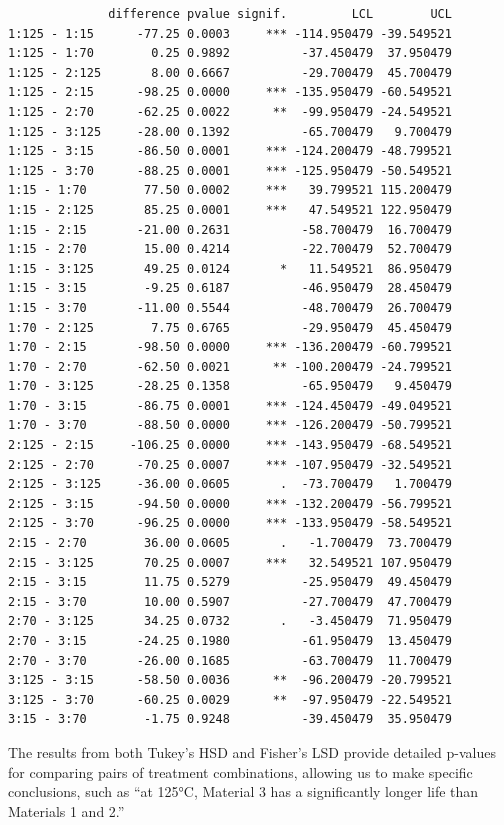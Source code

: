 \documentclass[
  letterpaper,
]{scrbook}
\begin{document}
\begin{verbatim}
              difference pvalue signif.         LCL        UCL
1:125 - 1:15      -77.25 0.0003     *** -114.950479 -39.549521
1:125 - 1:70        0.25 0.9892          -37.450479  37.950479
1:125 - 2:125       8.00 0.6667          -29.700479  45.700479
1:125 - 2:15      -98.25 0.0000     *** -135.950479 -60.549521
1:125 - 2:70      -62.25 0.0022      **  -99.950479 -24.549521
1:125 - 3:125     -28.00 0.1392          -65.700479   9.700479
1:125 - 3:15      -86.50 0.0001     *** -124.200479 -48.799521
1:125 - 3:70      -88.25 0.0001     *** -125.950479 -50.549521
1:15 - 1:70        77.50 0.0002     ***   39.799521 115.200479
1:15 - 2:125       85.25 0.0001     ***   47.549521 122.950479
1:15 - 2:15       -21.00 0.2631          -58.700479  16.700479
1:15 - 2:70        15.00 0.4214          -22.700479  52.700479
1:15 - 3:125       49.25 0.0124       *   11.549521  86.950479
1:15 - 3:15        -9.25 0.6187          -46.950479  28.450479
1:15 - 3:70       -11.00 0.5544          -48.700479  26.700479
1:70 - 2:125        7.75 0.6765          -29.950479  45.450479
1:70 - 2:15       -98.50 0.0000     *** -136.200479 -60.799521
1:70 - 2:70       -62.50 0.0021      ** -100.200479 -24.799521
1:70 - 3:125      -28.25 0.1358          -65.950479   9.450479
1:70 - 3:15       -86.75 0.0001     *** -124.450479 -49.049521
1:70 - 3:70       -88.50 0.0000     *** -126.200479 -50.799521
2:125 - 2:15     -106.25 0.0000     *** -143.950479 -68.549521
2:125 - 2:70      -70.25 0.0007     *** -107.950479 -32.549521
2:125 - 3:125     -36.00 0.0605       .  -73.700479   1.700479
2:125 - 3:15      -94.50 0.0000     *** -132.200479 -56.799521
2:125 - 3:70      -96.25 0.0000     *** -133.950479 -58.549521
2:15 - 2:70        36.00 0.0605       .   -1.700479  73.700479
2:15 - 3:125       70.25 0.0007     ***   32.549521 107.950479
2:15 - 3:15        11.75 0.5279          -25.950479  49.450479
2:15 - 3:70        10.00 0.5907          -27.700479  47.700479
2:70 - 3:125       34.25 0.0732       .   -3.450479  71.950479
2:70 - 3:15       -24.25 0.1980          -61.950479  13.450479
2:70 - 3:70       -26.00 0.1685          -63.700479  11.700479
3:125 - 3:15      -58.50 0.0036      **  -96.200479 -20.799521
3:125 - 3:70      -60.25 0.0029      **  -97.950479 -22.549521
3:15 - 3:70        -1.75 0.9248          -39.450479  35.950479
\end{verbatim}

The results from both Tukey's HSD and Fisher's LSD provide detailed
p-values for comparing pairs of treatment combinations, allowing us to
make specific conclusions, such as ``at 125°C, Material 3 has a
significantly longer life than Materials 1 and 2.''


\backmatter
\end{document}
